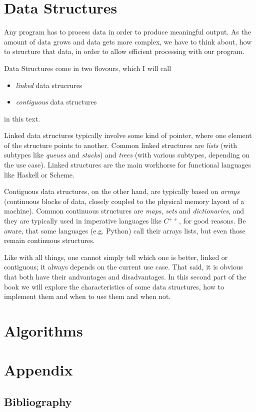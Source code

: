 \documentclass{scrbook}
\numberwithin{equation}{chapter}
\theoremstyle{definition}
\begin{document}





\part{Data Structures}

Any program has to process data in order to produce meaningful output.
As the amount of data grows and data gets more complex, we have to think about,
how to structure that data, in order to allow efficient processing with our program.

Data Structures come in two flovours, which I will call
\begin{itemize}
  \item \emph{linked} data strucrures
  \item \emph{contiguous} data structures
\end{itemize}

in this text.

Linked data structures typically involve some kind of pointer,
where one element of the structure points to another.
Common linked structures are \emph{lists} (with subtypes like \emph{queues}
and \emph{stacks}) and \emph{trees} (with various subtypes, depending on the use case).
Linked structures are the main workhorse for functional languages like
Haskell or Scheme.

Contiguous data structures, on the other hand, are typically based on \emph{arrays}
(continuous blocks of data, closely coupled to the physical memory layout of a machine).
Common continuous structures are \emph{maps}, \emph{sets} and \emph{dictionaries},
and they are typically used in imperative languages like $C^{++}$, for good reasons.
Be aware, that some languages (e.g. Python) call their arrays lists, but even those remain
continuous structures.

Like with all things, one cannot simply tell which one is better, linked or contiguous;
it always depends on the current use case.
That said, it is obvious that both have their andvantages and disadvantages.
In this second part of the book we will explore the characteristics of some data structures,
how to implement them and when to use them and when not.






\part{Algorithms}


\part{Appendix}
\appendix


\backmatter
\chapter{Bibliography}
\end{document}
